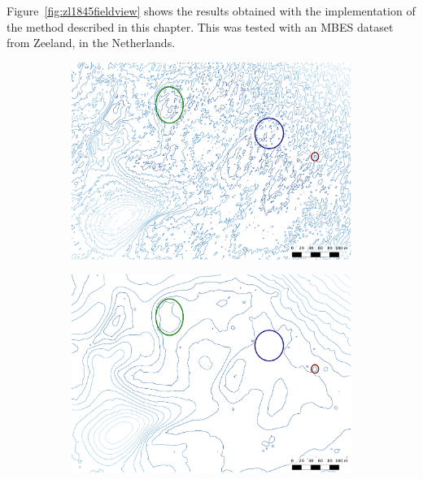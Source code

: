 Figure~\ref{fig:zl1845fieldview} shows the results obtained with the implementation of the method described in this chapter.
This was tested with an MBES dataset from Zeeland, in the Netherlands.
\begin{figure}
\centering
  \begin{subfigure}[b]{0.6\linewidth}
    \centering
    \includegraphics[width=\textwidth]{figs/zl1845fieldview_o.pdf}
    \caption{}\label{fig:zl1845fieldview_o}
  \end{subfigure}
  \quad
  \begin{subfigure}[b]{0.6\linewidth}
    \centering
    \includegraphics[width=\textwidth]{figs/zl1845fieldview_s.pdf}
    \caption{}\label{fig:zl1845fieldview_s}
  \end{subfigure}
  \quad
  \begin{subfigure}[b]{0.6\linewidth}

\end{subfigure}
\end{figure}
